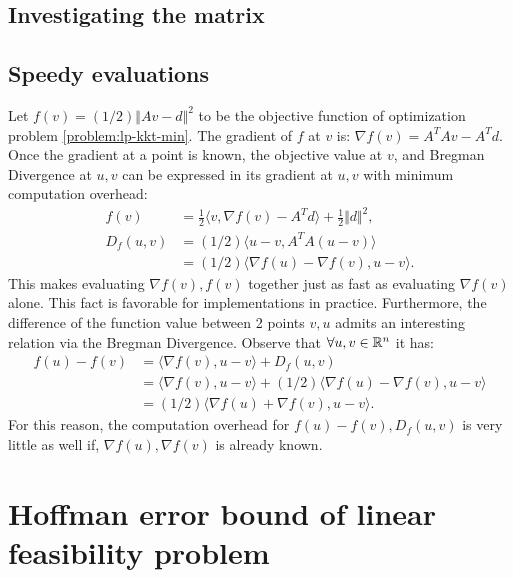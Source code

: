 \documentclass[12pt]{report}
\begin{document}
        \subsection{Investigating the matrix}
        \subsection{Speedy evaluations}
            Let $f(v) = (1/2)\Vert Av - d\Vert^2$ to be the objective function of optimization problem \eqref{problem:lp-kkt-min}. 
            The gradient of $f$ at $v$ is: $\nabla f(v) = A^TAv - A^Td$. 
            Once the gradient at a point is known, the objective value at $v$, and Bregman Divergence at $u, v$ can be expressed in its gradient at $u, v$ with minimum computation overhead: 
            \begin{align*}
                f(v) &= 
                \frac{1}{2}\langle v, \nabla f(v) - A^Td\rangle + \frac{1}{2}\Vert d\Vert^2, 
                \\
                D_f(u, v) &= (1/2)\langle u - v, A^TA (u - v)\rangle
                \\
                &= (1/2)\langle \nabla f(u) - \nabla f(v), u - v\rangle. 
            \end{align*}
            This makes evaluating $\nabla f(v), f(v)$ together just as fast as evaluating $\nabla f(v)$ alone.
            This fact is favorable for implementations in practice. 
            Furthermore, the difference of the function value between 2 points $v, u$ admits an interesting relation via the Bregman Divergence. 
            Observe that $\forall u, v \in \mathbb R^n$ it has: 
            \begin{align*}
                f(u) - f(v) &= \langle \nabla f(v), u - v \rangle + D_f(u, v)
                \\
                &= \langle \nabla f(v), u - v \rangle + (1/2)\langle \nabla f(u) - \nabla f(v), u - v\rangle
                \\
                &= (1/2)\langle \nabla f(u) + \nabla f(v), u - v\rangle. 
            \end{align*}
            For this reason, the computation overhead for $f(u) - f(v), D_f(u, v)$ is very little as well if, $\nabla f(u), \nabla f(v)$ is already known.
    \section{Hoffman error bound of linear feasibility problem}
\end{document}
